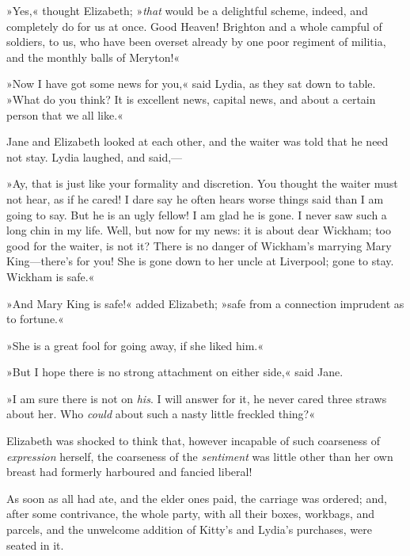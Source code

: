 »Yes,« thought Elizabeth; »\textit{that} would be a delightful scheme, indeed, and completely do for us at once. Good Heaven! Brighton and a whole campful of soldiers, to us, who have been overset already by one poor regiment of militia, and the monthly balls of Meryton!«

»Now I have got some news for you,« said Lydia, as they sat down to table. »What do you think? It is excellent news, capital news, and about a certain person that we all like.«

Jane and Elizabeth looked at each other, and the waiter was told that he need not stay. Lydia laughed, and said,—

»Ay, that is just like your formality and discretion. You thought the waiter must not hear, as if he cared! I dare say he often hears worse things said than I am going to say. But he is an ugly fellow! I am glad he is gone. I never saw such a long chin in my life. Well, but now for my news: it is about dear Wickham; too good for the waiter, is not it? There is no danger of Wickham's marrying Mary King—there's for you! She is gone down to her uncle at Liverpool; gone to stay. Wickham is safe.«

»And Mary King is safe!« added Elizabeth; »safe from a connection imprudent as to fortune.«

»She is a great fool for going away, if she liked him.«

»But I hope there is no strong attachment on either side,« said Jane.

»I am sure there is not on \textit{his}. I will answer for it, he never cared three straws about her. Who \textit{could} about such a nasty little freckled thing?«

Elizabeth was shocked to think that, however incapable of such coarseness of \textit{expression} herself, the coarseness of the \textit{sentiment} was little other than her own breast had formerly harboured and fancied liberal!

As soon as all had ate, and the elder ones paid, the carriage was ordered; and, after some contrivance, the whole party, with all their boxes, workbags, and parcels, and the unwelcome addition of Kitty's and Lydia's purchases, were seated in it.

